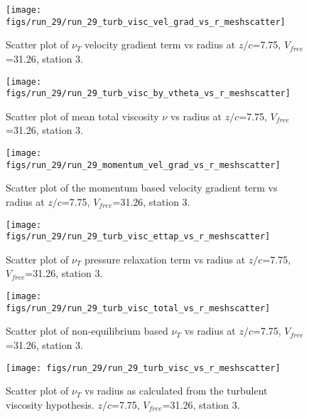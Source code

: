\begin{figure}[H]
\centering
\texttt{[image: figs/run\_29/run\_29\_turb\_visc\_vel\_grad\_vs\_r\_meshscatter]}
\caption{Scatter plot of $\nu_T$ velocity gradient term vs radius at $z/c$=7.75, $V_{free}$=31.26, station 3.}
\end{figure}


\begin{figure}[H]
\centering
\texttt{[image: figs/run\_29/run\_29\_turb\_visc\_by\_vtheta\_vs\_r\_meshscatter]}
\caption{Scatter plot of mean total viscosity $\nu$ vs radius at $z/c$=7.75, $V_{free}$=31.26, station 3.}
\end{figure}


\begin{figure}[H]
\centering
\texttt{[image: figs/run\_29/run\_29\_momentum\_vel\_grad\_vs\_r\_meshscatter]}
\caption{Scatter plot of the momentum based velocity gradient term vs radius at $z/c$=7.75, $V_{free}$=31.26, station 3.}
\end{figure}


\begin{figure}[H]
\centering
\texttt{[image: figs/run\_29/run\_29\_turb\_visc\_ettap\_vs\_r\_meshscatter]}
\caption{Scatter plot of $\nu_T$ pressure relaxation term vs radius at $z/c$=7.75, $V_{free}$=31.26, station 3.}
\end{figure}


\begin{figure}[H]
\centering
\texttt{[image: figs/run\_29/run\_29\_turb\_visc\_total\_vs\_r\_meshscatter]}
\caption{Scatter plot of non-equilibrium based $\nu_T$ vs radius at $z/c$=7.75, $V_{free}$=31.26, station 3.}
\end{figure}


\begin{figure}[H]
\centering
\texttt{[image: figs/run\_29/run\_29\_turb\_visc\_vs\_r\_meshscatter]}
\caption{Scatter plot of $\nu_T$ vs radius as calculated from the turbulent viscosity hypothesis. $z/c$=7.75, $V_{free}$=31.26, station 3.}
\end{figure}


